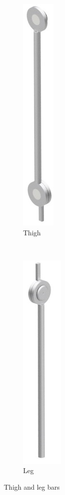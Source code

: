 \begin{figure}[thpb]
      \begin{subfigure}[b]{0.45\textwidth}
      	\centering
      	\includegraphics[height=0.3\textheight]{Images/Barra_Coxa.jpg}
      	\caption{Thigh}
      	\label{barra coxa}  
      \end{subfigure}
      ~
      \begin{subfigure}[b]{0.45\textwidth}
      	\centering
      	\includegraphics[height=0.3\textheight]{Images/Canela.jpg}
     	\caption{Leg}
     	\label{barra canela}
      \end{subfigure}
      \caption{Thigh and leg bars}
      
   \end{figure}
   
